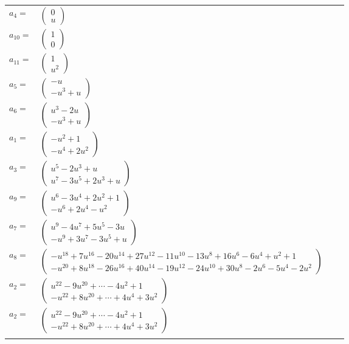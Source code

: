 \documentclass[1p]{elsarticle_modified}
\theoremstyle{definition}
\begin{document}
\begin{tabular}{m{7pt} m{180pt} m{7pt} m{180pt} }
\flushright $a_{4}=$&$\begin{pmatrix}0\\u\end{pmatrix}$ \\
\flushright $a_{10}=$&$\begin{pmatrix}1\\0\end{pmatrix}$ \\
\flushright $a_{11}=$&$\begin{pmatrix}1\\u^2\end{pmatrix}$ \\
\flushright $a_{5}=$&$\begin{pmatrix}- u\\- u^3+u\end{pmatrix}$ \\
\flushright $a_{6}=$&$\begin{pmatrix}u^3-2 u\\- u^3+u\end{pmatrix}$ \\
\flushright $a_{1}=$&$\begin{pmatrix}- u^2+1\\- u^4+2 u^2\end{pmatrix}$ \\
\flushright $a_{3}=$&$\begin{pmatrix}u^5-2 u^3+u\\u^7-3 u^5+2 u^3+u\end{pmatrix}$ \\
\flushright $a_{9}=$&$\begin{pmatrix}u^6-3 u^4+2 u^2+1\\- u^6+2 u^4- u^2\end{pmatrix}$ \\
\flushright $a_{7}=$&$\begin{pmatrix}u^9-4 u^7+5 u^5-3 u\\- u^9+3 u^7-3 u^5+u\end{pmatrix}$ \\
\flushright $a_{8}=$&$\begin{pmatrix}- u^{18}+7 u^{16}-20 u^{14}+27 u^{12}-11 u^{10}-13 u^8+16 u^6-6 u^4+u^2+1\\- u^{20}+8 u^{18}-26 u^{16}+40 u^{14}-19 u^{12}-24 u^{10}+30 u^8-2 u^6-5 u^4-2 u^2\end{pmatrix}$ \\
\flushright $a_{2}=$&$\begin{pmatrix}u^{22}-9 u^{20}+\cdots-4 u^2+1\\- u^{22}+8 u^{20}+\cdots+4 u^4+3 u^2\end{pmatrix}$\\ \flushright $a_{2}=$&$\begin{pmatrix}u^{22}-9 u^{20}+\cdots-4 u^2+1\\- u^{22}+8 u^{20}+\cdots+4 u^4+3 u^2\end{pmatrix}$\\&\end{tabular}
\end{document}
